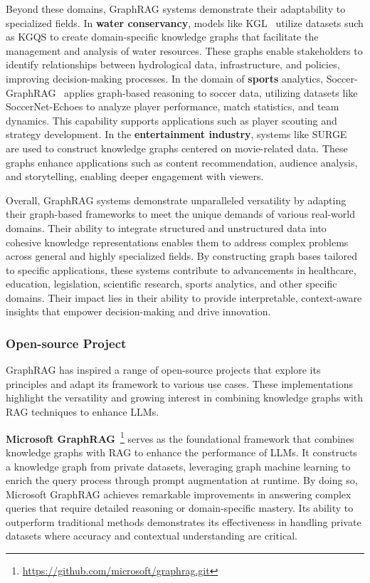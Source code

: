 \documentclass[lettersize,journal]{IEEEtran}
\begin{document}
Beyond these domains, GraphRAG systems demonstrate their adaptability to specialized fields. In \textbf{water conservancy}, models like KGL~\cite{yang2024intelligent} utilize datasets such as KGQS to create domain-specific knowledge graphs that facilitate the management and analysis of water resources. These graphs enable stakeholders to identify relationships between hydrological data, infrastructure, and policies, improving decision-making processes. In the domain of \textbf{sports} analytics, Soccer-GraphRAG~\cite{sepasdar2024soccer} applies graph-based reasoning to soccer data, utilizing datasets like SoccerNet-Echoes to analyze player performance, match statistics, and team dynamics. This capability supports applications such as player scouting and strategy development. In the \textbf{entertainment industry}, systems like SURGE~\cite{kang2023knowledge} are used to construct knowledge graphs centered on movie-related data. These graphs enhance applications such as content recommendation, audience analysis, and storytelling, enabling deeper engagement with viewers. 

Overall, GraphRAG systems demonstrate unparalleled versatility by adapting their graph-based frameworks to meet the unique demands of various real-world domains. Their ability to integrate structured and unstructured data into cohesive knowledge representations enables them to address complex problems across general and highly specialized fields. By constructing graph bases tailored to specific applications, these systems contribute to advancements in healthcare, education, legislation, scientific research, sports analytics, and other specific domains. Their impact lies in their ability to provide interpretable, context-aware insights that empower decision-making and drive innovation.



\subsubsection{Open-source Project}


GraphRAG has inspired a range of open-source projects that explore its principles and adapt its framework to various use cases. These implementations highlight the versatility and growing interest in combining knowledge graphs with RAG techniques to enhance LLMs.

\textbf{Microsoft GraphRAG}~\footnote{\url{https://github.com/microsoft/graphrag.git}} serves as the foundational framework that combines knowledge graphs with RAG to enhance the performance of LLMs. It constructs a knowledge graph from private datasets, leveraging graph machine learning to enrich the query process through prompt augmentation at runtime. By doing so, Microsoft GraphRAG achieves remarkable improvements in answering complex queries that require detailed reasoning or domain-specific mastery. Its ability to outperform traditional methods demonstrates its effectiveness in handling private datasets where accuracy and contextual understanding are critical.
\end{document}
